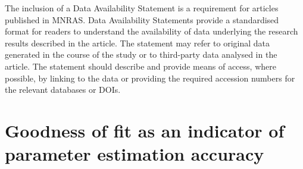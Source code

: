 \documentclass[fleqn,usenatbib]{mnras}
\begin{document}
The inclusion of a Data Availability Statement is a requirement for articles published in MNRAS. Data Availability Statements provide a standardised format for readers to understand the availability of data underlying the research results described in the article. The statement may refer to original data generated in the course of the study or to third-party data analysed in the article. The statement should describe and provide means of access, where possible, by linking to the data or providing the required accession numbers for the relevant databases or DOIs.







\appendix

\section{Goodness of fit as an indicator of parameter estimation accuracy}
\label{a: error vs error}
\end{document}
